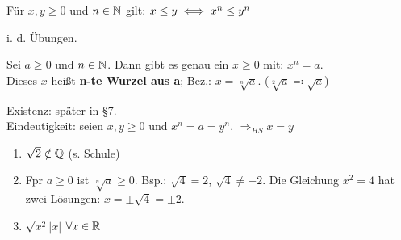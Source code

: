 \begin{hilfssatz*}[HS]
	Für $x, y \geq 0$ und $n \in \mathbb{N}$ gilt: $x \leq y \iff x^{n} \leq y^{n}$	
\end{hilfssatz*}

\begin{beweis}
	i. d. Übungen.
\end{beweis}


\begin{satz} 
	Sei $a \geq 0$ und $n \in \mathbb{N}$. Dann gibt es genau ein $x \geq 0$ mit: $x^{n} = a$. \\
	Dieses $x$ hei{\ss}t \textbf{n-te Wurzel aus a}; Bez.: $x = \sqrt[n]{a}$. ($\sqrt[2]{a} \eqqcolon \sqrt{a}$)
\end{satz}

\begin{beweis}
	Existenz: später in \S 7. \\
	Eindeutigkeit: seien $x, y \geq 0$ und $x^{n} = a = y^{n}$. $\Rightarrow_{HS} x = y$
\end{beweis}


\begin{bemerkungen*}
	\begin{enumerate}
		\item $\sqrt{2} \notin \mathbb{Q}$ (s. Schule)
		\item Fpr $a \geq 0$ ist $\sqrt[n]{a} \geq 0$. Bsp.: $\sqrt{4} = 2$, $\sqrt{4} \neq - 2$. Die Gleichung $x^{2} = 4$ hat zwei Lösungen: $x = \pm \sqrt{4} = \pm 2$.
		\item $\sqrt{x^{2}} |x|$ $\forall x \in \mathbb{R}$
	\end{enumerate}
\end{bemerkungen*}


